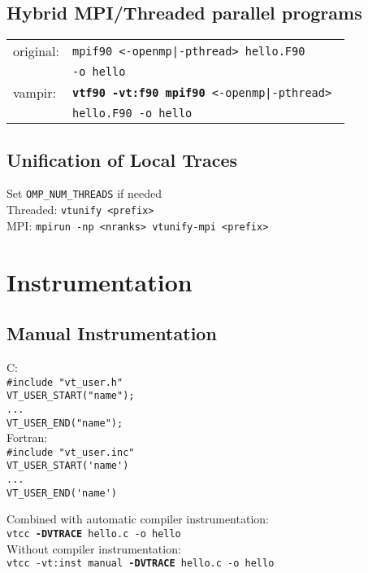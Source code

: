 \begin{multicols}{3}
\subsection{Hybrid MPI/Threaded parallel programs}
\begin{tabular}{@{}ll@{}}
original:              &  \tt mpif90 <-openmp|-pthread> hello.F90 \\
                       &  \tt -o hello \\
vampir:  &  \tt \textbf{vtf90 -vt:f90 mpif90} <-openmp|-pthread> \\
                       &  \tt hello.F90 -o hello\\
\end{tabular}

\subsection{Unification of Local Traces}
Set \texttt{OMP\_NUM\_THREADS} if needed\\
Threaded: \verb!vtunify <prefix>!\\
MPI: \verb!mpirun -np <nranks> vtunify-mpi <prefix>!

\section{Instrumentation}
\subsection{Manual Instrumentation}

\begin{multicols}{2}
C:\\
\verb!#include "vt_user.h"!\\
\verb!VT_USER_START("name");!\\
\verb!...!\\
\verb!VT_USER_END("name");!\\

Fortran:\\
\verb!#include "vt_user.inc"!\\
\verb!VT_USER_START('name')!\\
\verb!...!\\
\verb!VT_USER_END('name')!
\end{multicols}
\vspace{2ex}
Combined with automatic compiler instrumentation:\\
\texttt{vtcc \textbf{-DVTRACE} hello.c -o hello}\\[1ex]
Without compiler instrumentation:\\
\texttt{vtcc -vt:inst manual \textbf{-DVTRACE} hello.c -o hello}


\end{multicols}
